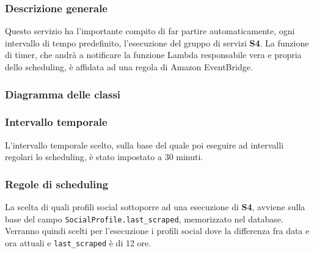\subsubsection{Descrizione generale}
Questo servizio ha l'importante compito di far partire automaticamente,
ogni intervallo di tempo predefinito, l'esecuzione del gruppo di servizi \textbf{S4}.
La funzione di timer, che andrà a notificare la funzione Lambda responsabile vera e propria dello
scheduling, è affidata ad una regola di Amazon EventBridge.

\subsubsection{Diagramma delle classi}

\subsubsection{Intervallo temporale}
L'intervallo temporale scelto, sulla base del quale poi eseguire ad intervalli regolari lo scheduling,
è stato impostato a 30 minuti.

\subsubsection{Regole di scheduling}
La scelta di quali profili social sottoporre ad una esecuzione di \textbf{S4}, avviene sulla base del
campo \verb|SocialProfile.last_scraped|, memorizzato nel database. Verranno quindi scelti per l'esecuzione
i profili social dove la differenza fra data e ora attuali e \verb|last_scraped| è di 12 ore.
